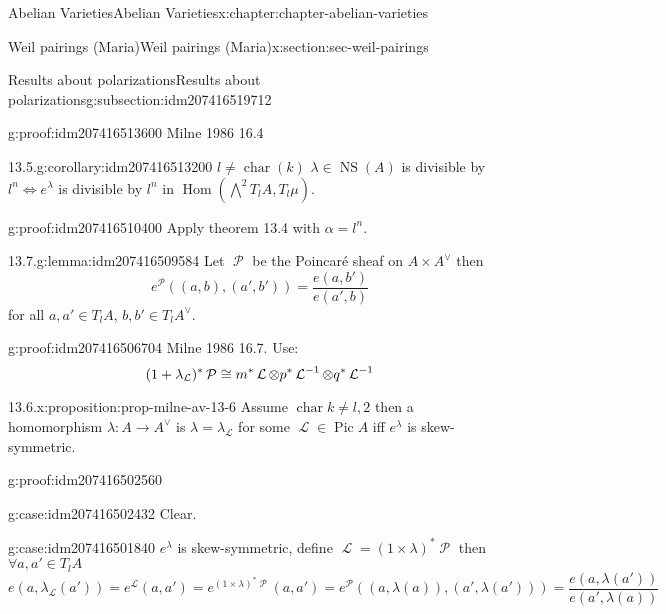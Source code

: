 \documentclass[oneside,10pt,]{book}
\newcommand{\qedhere}{\relax}
\numberwithin{equation}{section}
\newcommand{\sheaf}[1]{\operatorname{\mathcal{#1}}}
\DeclareMathOperator{\Hom}{Hom}
\DeclareMathOperator{\Pic}{Pic}
\DeclareMathOperator{\characteristic}{char}
\DeclareMathOperator{\NS}{NS}
\begin{document}
\begin{chapterptx}{Abelian Varieties}{}{Abelian Varieties}{}{}{x:chapter:chapter-abelian-varieties}
\begin{sectionptx}{Weil pairings (Maria)}{}{Weil pairings (Maria)}{}{}{x:section:sec-weil-pairings}
\begin{subsectionptx}{Results about polarizations}{}{Results about polarizations}{}{}{g:subsection:idm207416519712}
\begin{proofptx}{}{g:proof:idm207416513600}
Milne 1986 16.4%
\end{proofptx}
\begin{corollary}{13.5.}{}{g:corollary:idm207416513200}%
\(l \ne \characteristic (k)\) \(\lambda \in \NS(A) \) is divisible by \(l^n \iff e^\lambda\) is divisible by \(l^n\) in \(\Hom (\bigwedge^2 T_lA, T_l \mu)\).%
\end{corollary}
\begin{proofptx}{}{g:proof:idm207416510400}
Apply theorem 13.4 with \(\alpha = l^n\).%
\end{proofptx}
\begin{lemma}{13.7.}{}{g:lemma:idm207416509584}%
Let \(\sheaf P\) be the Poincaré sheaf on \(A\times A^\vee\) then%
\begin{equation*}
e^{\sheaf P} ((a,b),(a',b')) = \frac{e(a,b')}{e(a',b)}
\end{equation*}
for all \(a,a' \in T_l A\), \(b,b' \in T_l A^\vee\).%
\end{lemma}
\begin{proofptx}{}{g:proof:idm207416506704}
Milne 1986 16.7. Use:%
\begin{equation*}
(1+ \lambda_{\sheaf L})^* \sheaf P \cong m^* \sheaf L \otimes p^* \sheaf L^{-1} \otimes q^* \sheaf L^{-1}\qedhere
\end{equation*}
%
\end{proofptx}
\begin{proposition}{13.6.}{}{x:proposition:prop-milne-av-13-6}%
Assume \(\characteristic k \ne l,2\) then a homomorphism \(\lambda\colon A\to A^\vee\) is \(\lambda = \lambda_{\sheaf L}\) for some \(\sheaf L \in \Pic A\) iff \(e^\lambda\) is skew-symmetric.%
\end{proposition}
\begin{proofptx}{}{g:proof:idm207416502560}
\begin{case}{}{}{g:case:idm207416502432}
Clear.%
\end{case}
\begin{case}{}{}{g:case:idm207416501840}
\(e^\lambda\) is skew-symmetric, define \(\sheaf L = (1 \times \lambda)^* \sheaf P\) then  \(\forall a,a' \in T_l A\)%
\begin{equation*}
e(a,\lambda_{\sheaf L} (a') ) = e^{\sheaf L}(a,a') = e^{(1\times \lambda)^* \sheaf P} (a,a') = e^{\sheaf P}((a,\lambda (a)), (a',\lambda(a'))) = \frac{e(a,\lambda (a'))}{ e(a',\lambda(a))}
\end{equation*}
%
\begin{equation*}

\end{equation*}
\end{case}
\end{proofptx}
\end{subsectionptx}
\end{sectionptx}
\end{chapterptx}
\end{document}
